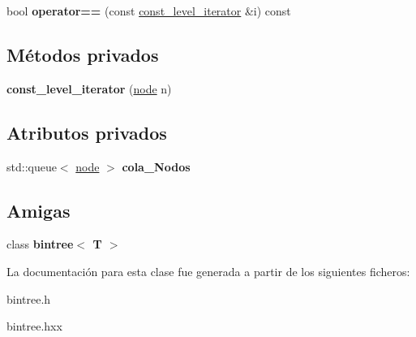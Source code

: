 \begin{DoxyCompactItemize}
\item 
\hypertarget{classbintree_1_1const__level__iterator_a803adc590ceaa61f12a0e2da37020591}{}bool {\bfseries operator==} (const \hyperlink{classbintree_1_1const__level__iterator}{const\+\_\+level\+\_\+iterator} \&i) const \label{classbintree_1_1const__level__iterator_a803adc590ceaa61f12a0e2da37020591}

\end{DoxyCompactItemize}
\subsection*{Métodos privados}
\begin{DoxyCompactItemize}
\item 
\hypertarget{classbintree_1_1const__level__iterator_a934829d0f2837c0208e519ec2d866559}{}{\bfseries const\+\_\+level\+\_\+iterator} (\hyperlink{classbintree_1_1node}{node} n)\label{classbintree_1_1const__level__iterator_a934829d0f2837c0208e519ec2d866559}

\end{DoxyCompactItemize}
\subsection*{Atributos privados}
\begin{DoxyCompactItemize}
\item 
\hypertarget{classbintree_1_1const__level__iterator_ac1ffe345e43ddb6647f0e5a1bc1c0bda}{}std\+::queue$<$ \hyperlink{classbintree_1_1node}{node} $>$ {\bfseries cola\+\_\+\+Nodos}\label{classbintree_1_1const__level__iterator_ac1ffe345e43ddb6647f0e5a1bc1c0bda}

\end{DoxyCompactItemize}
\subsection*{Amigas}
\begin{DoxyCompactItemize}
\item 
\hypertarget{classbintree_1_1const__level__iterator_a300e602ae13bd21fa092c5a5899e9eda}{}class {\bfseries bintree$<$ T $>$}\label{classbintree_1_1const__level__iterator_a300e602ae13bd21fa092c5a5899e9eda}

\end{DoxyCompactItemize}


La documentación para esta clase fue generada a partir de los siguientes ficheros\+:\begin{DoxyCompactItemize}
\item 
bintree.\+h\item 
bintree.\+hxx\end{DoxyCompactItemize}
